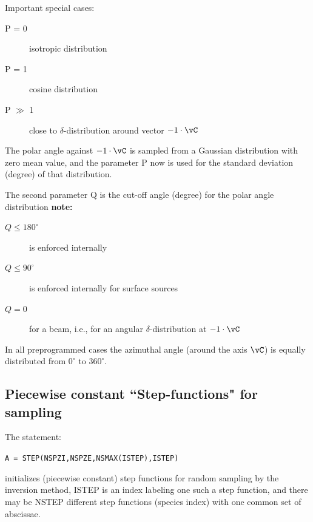 \begin{description}
\begin{description}
\begin{description}
                        Important special cases:
                        \begin{description}
                          \item[P = 0] isotropic distribution
                          \item[P = 1] cosine distribution
                          \item[P
                                $\gg$ 1] close to $\delta$-distribution around vector $-1  \cdot \vC $
                        \end{description}
                  \item[$= 2$] The polar angle against $-1  \cdot  \vC $ is
                        sampled from a Gaussian distribution with zero mean value, and the parameter P
                        now is used for the standard deviation (degree) of that distribution.
                \end{description}
        \end{description}
        The second parameter Q is the cut-off angle (degree) for the polar angle
        distribution \textbf{note:} 

        \begin{description}
          \item[$Q \le 180^{\circ}$] is enforced internally
          \item[$Q
                  \le 90^{\circ}$] is enforced internally for surface sources
          \item[$Q = 0$]  for
                a beam, i.e., for an angular $\delta$-distribution at $-1  \cdot  \vC $
        \end{description}
\end{description}
In all preprogrammed cases the azimuthal
angle (around the axis $\vC$) is equally distributed from $0^{\circ}$ to
$360^{\circ}$.

\subsection{Piecewise constant ``Step-functions" for sampling}
\label{sec2.7.1}

The statement:

\lstinline|A = STEP(NSPZI,NSPZE,NSMAX(ISTEP),ISTEP)|

initializes (piecewise constant) step functions for random sampling by the
inversion method,
ISTEP is an index labeling one such a step function, and there may be NSTEP
different step functions (species index)
with one common set of abscissae.

